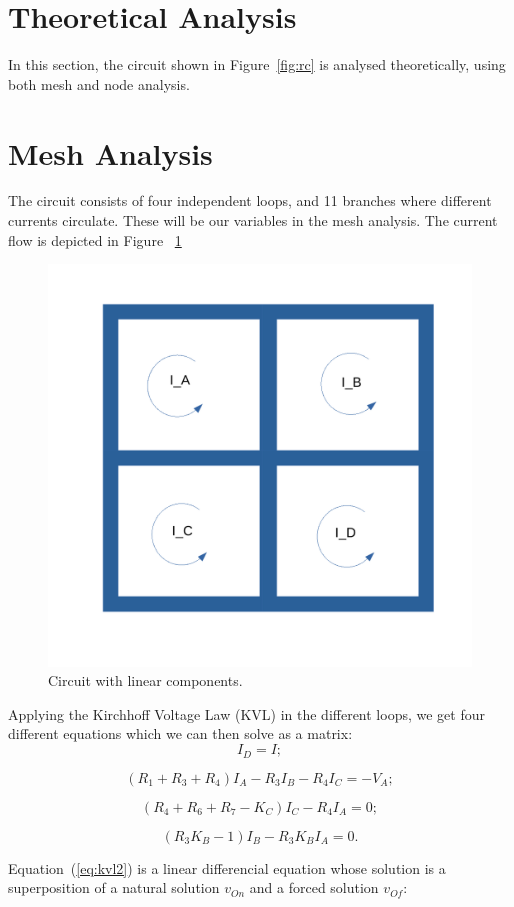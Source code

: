 \section{Theoretical Analysis}
\label{sec:analysis}

In this section, the circuit shown in Figure~\ref{fig:rc} is analysed
theoretically, using both mesh and node analysis.

\section{Mesh Analysis}

The circuit consists of four independent loops, and 11 branches where different currents circulate. These will be our variables in the mesh analysis. The current flow is depicted in Figure ~\ref{fig:current}

\begin{figure}[h] \centering
\includegraphics[width=0.4\linewidth]{current.pdf}
\caption{Circuit with linear components.}
\label{fig:current}
\end{figure}


Applying the Kirchhoff Voltage Law (KVL) in the different loops, we get four different equations which we can then solve as a matrix:
\begin{equation}
  I_D=I;
\end{equation}

\begin{equation}
  (R_1+R_3+R_4)I_A-R_3I_B-R_4I_C=-V_A;
\end{equation}

\begin{equation}
  (R_4+R_6+R_7-K_C)I_C-R_4I_A=0;
\end{equation}

\begin{equation}
  (R_3K_B-1)I_B-R_3K_BI_A=0.
\end{equation}

Equation~(\ref{eq:kvl2}) is a linear differencial equation whose solution is a
superposition of a natural solution $v_{On}$ and a forced solution $v_{Of}$:

